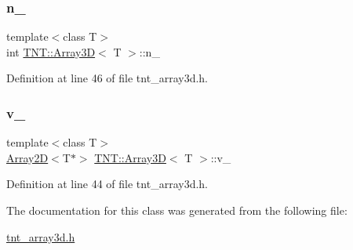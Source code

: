 \subsubsection{\texorpdfstring{n\+\_\+}{n\_}}
{\footnotesize\ttfamily template$<$class T$>$ \\
int \hyperlink{classTNT_1_1Array3D}{T\+N\+T\+::\+Array3D}$<$ T $>$\+::n\+\_\+\hspace{0.3cm}{\ttfamily [private]}}



Definition at line 46 of file tnt\+\_\+array3d.\+h.

\mbox{\label{classTNT_1_1Array3D_ac436fdc7a50e50e37648a735e7eff893}} 
\subsubsection{\texorpdfstring{v\+\_\+}{v\_}}
{\footnotesize\ttfamily template$<$class T$>$ \\
\hyperlink{classTNT_1_1Array2D}{Array2D}$<$T$\ast$$>$ \hyperlink{classTNT_1_1Array3D}{T\+N\+T\+::\+Array3D}$<$ T $>$\+::v\+\_\+\hspace{0.3cm}{\ttfamily [private]}}



Definition at line 44 of file tnt\+\_\+array3d.\+h.



The documentation for this class was generated from the following file\+:\begin{DoxyCompactItemize}
\item 
\hyperlink{tnt__array3d_8h}{tnt\+\_\+array3d.\+h}\end{DoxyCompactItemize}
